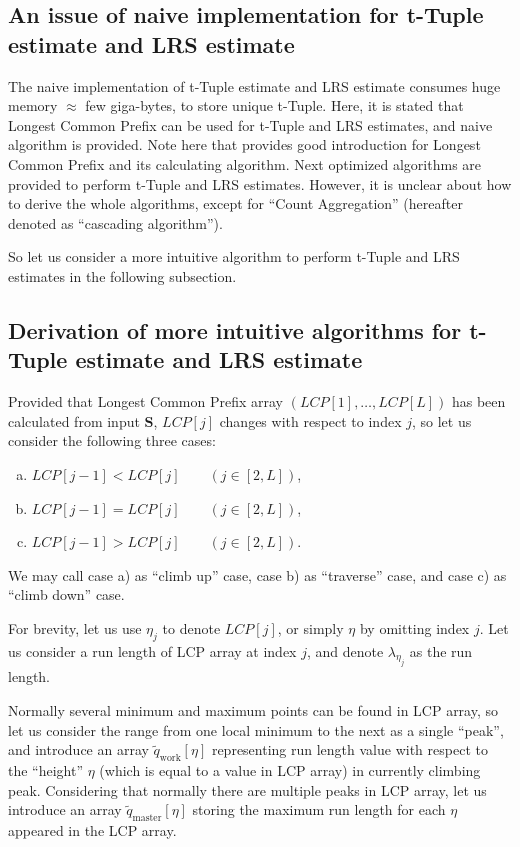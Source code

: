﻿\documentclass[a3paper,xelatex,english]{bxjsarticle}
\newcommand\mib[1]{\boldsymbol{#1}}
\begin{document}
\subsection{An issue of naive implementation for t-Tuple estimate and LRS estimate}
The naive implementation of t-Tuple estimate and LRS estimate consumes huge memory $\approx$ few giga-bytes, to store unique t-Tuple. 
Here, it is stated that Longest Common Prefix can be used for t-Tuple and LRS estimates, and naive algorithm is provided\cite{JoshaHill}.
Note here that \cite{MIT} provides good introduction for Longest Common Prefix and its calculating algorithm.
Next optimized algorithms are provided to perform t-Tuple and LRS estimates\cite{Kaufer}.
However, it is unclear about how to derive the whole algorithms, except for ``Count Aggregation'' (hereafter denoted as ``cascading algorithm'').

So let us consider a more intuitive algorithm to perform t-Tuple and LRS estimates in the following subsection.

\subsection{Derivation of more intuitive algorithms for t-Tuple estimate and LRS estimate}
Provided that Longest Common Prefix array $(LCP[1], \ldots, LCP[L])$ has been calculated from input $\mib{S}$, 
$LCP[j]$ changes with respect to index $j$, so let us consider the following three cases: 
\begin{enumerate}[a)]
	\item $LCP[j - 1] < LCP[j] \qquad (j \in [2, L])$,
	\item $LCP[j - 1] = LCP[j] \qquad (j \in [2, L])$,
	\item $LCP[j - 1] > LCP[j] \qquad (j \in [2, L])$.
\end{enumerate}

We may call case a) as ``climb up'' case, case b) as ``traverse'' case, and case c) as ``climb down'' case.

For brevity, let us use $\eta_{j}$ to denote $LCP[j]$,  or simply $\eta$ by omitting index $j$.
Let us consider a run length of LCP array at index $j$, and denote $\lambda_{\eta_{j}}$ as the run length.

Normally several minimum and maximum points can be found in LCP array, 
so let us consider the range from one local minimum to the next as a single ``peak'', and introduce an array $\tilde{q}_{\textrm{work}}[\eta]$ representing run length value with respect to the ``height'' $\eta$ (which is equal to a value in LCP array) in currently climbing peak.
Considering that normally there are multiple peaks in LCP array, let us introduce an array $\tilde{q}_{\textrm{master}}[\eta]$ storing the maximum run length for each $\eta$ appeared in the LCP array.
\end{document}
